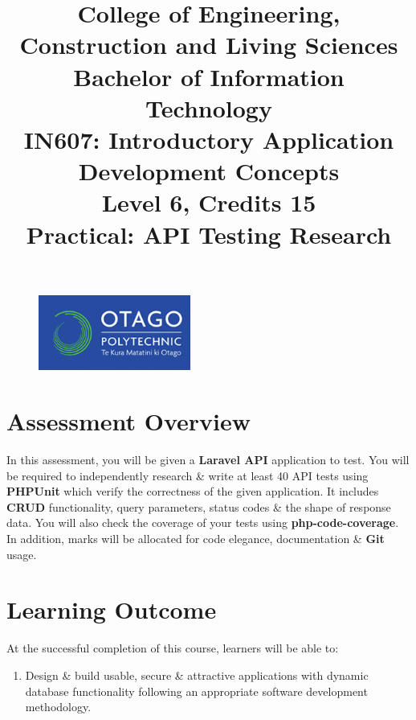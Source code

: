 \documentclass{article}
\author{}
\begin{document}
\begin{figure}
    \centering
    \includegraphics[width=50mm]{../img/logo.png}
\end{figure}

\title{College of Engineering, Construction and Living Sciences\\Bachelor of Information Technology\\IN607: Introductory Application Development Concepts\\Level 6, Credits 15\\\textbf{Practical: API Testing Research}}
\date{}
\maketitle

\section*{Assessment Overview}
In this assessment, you will be given a \textbf{Laravel API} application to test. You will be required to independently research \& write at least 40 API tests using \textbf{PHPUnit} which verify the correctness of the given application. It includes \textbf{CRUD} functionality, query parameters, status codes \& the shape of response data. You will also check the coverage of your tests using \textbf{php-code-coverage}. In addition, marks will be allocated for code elegance, documentation \& \textbf{Git} usage. 

\section*{Learning Outcome}
At the successful completion of this course, learners will be able to:
\begin{enumerate}
    \item Design \& build usable, secure \& attractive applications with dynamic database functionality following an appropriate software development methodology.
\end{enumerate}
\end{document}
